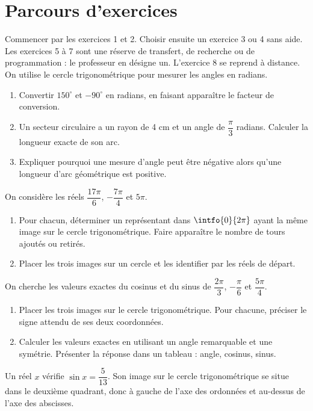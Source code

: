 \section*{Parcours d’exercices}\label{C10-PARC}
Commencer par les exercices 1 et 2. Choisir ensuite un exercice 3 ou 4 sans aide. Les exercices 5 à 7 sont une réserve de transfert, de recherche ou de programmation : le professeur en désigne un. L’exercice 8 se reprend à distance.
\begingroup
{}
On utilise le cercle trigonométrique pour mesurer les angles en radians.
\begin{enumerate}[label=\arabic*.]
\item Convertir $150^\circ$ et $-90^\circ$ en radians, en faisant apparaître le facteur de conversion.
\item Un secteur circulaire a un rayon de 4 cm et un angle de $\dfrac\pi3$ radians. Calculer la longueur exacte de son arc.
\item Expliquer pourquoi une mesure d’angle peut être négative alors qu’une longueur d’arc géométrique est positive.
\end{enumerate}
On considère les réels $\dfrac{17\pi}{6}$, $-\dfrac{7\pi}{4}$ et $5\pi$.
\begin{enumerate}[label=\arabic*.]
\item Pour chacun, déterminer un représentant dans $\intfo{0}{2\pi}$ ayant la même image sur le cercle trigonométrique. Faire apparaître le nombre de tours ajoutés ou retirés.
\item Placer les trois images sur un cercle et les identifier par les réels de départ.
\end{enumerate}
On cherche les valeurs exactes du cosinus et du sinus de $\dfrac{2\pi}{3}$, $-\dfrac\pi6$ et $\dfrac{5\pi}{4}$.
\begin{enumerate}[label=\arabic*.]
\item Placer les trois images sur le cercle trigonométrique. Pour chacune, préciser le signe attendu de ses deux coordonnées.
\item Calculer les valeurs exactes en utilisant un angle remarquable et une symétrie. Présenter la réponse dans un tableau : angle, cosinus, sinus.
\end{enumerate}
Un réel $x$ vérifie $\sin x=\dfrac5{13}$. Son image sur le cercle trigonométrique se situe dans le deuxième quadrant, donc à gauche de l’axe des ordonnées et au-dessus de l’axe des abscisses.

